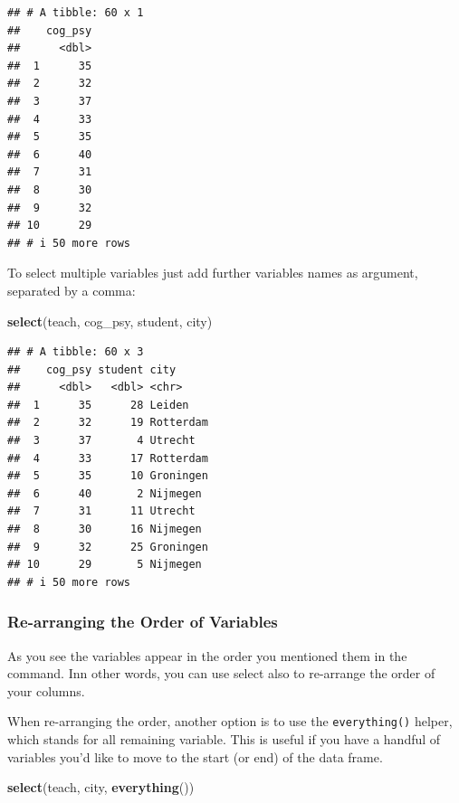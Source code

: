 \documentclass[
]{scrartcl}
\newenvironment{Shaded}{\begin{snugshade}}{\end{snugshade}}
\newcommand{\KeywordTok}[1]{\textcolor[rgb]{0.13,0.29,0.53}{\textbf{#1}}}
\newcommand{\NormalTok}[1]{#1}
\begin{document}
\begin{verbatim}
## # A tibble: 60 x 1
##    cog_psy
##      <dbl>
##  1      35
##  2      32
##  3      37
##  4      33
##  5      35
##  6      40
##  7      31
##  8      30
##  9      32
## 10      29
## # i 50 more rows
\end{verbatim}

To select multiple variables just add further variables names as argument, separated by a comma:

\begin{Shaded}
\begin{Highlighting}[]
\KeywordTok{select}\NormalTok{(teach, cog\_psy, student, city)}
\end{Highlighting}
\end{Shaded}

\begin{verbatim}
## # A tibble: 60 x 3
##    cog_psy student city     
##      <dbl>   <dbl> <chr>    
##  1      35      28 Leiden   
##  2      32      19 Rotterdam
##  3      37       4 Utrecht  
##  4      33      17 Rotterdam
##  5      35      10 Groningen
##  6      40       2 Nijmegen 
##  7      31      11 Utrecht  
##  8      30      16 Nijmegen 
##  9      32      25 Groningen
## 10      29       5 Nijmegen 
## # i 50 more rows
\end{verbatim}

\hypertarget{re-arranging-the-order-of-variables}{%
\subsubsection{Re-arranging the Order of Variables}\label{re-arranging-the-order-of-variables}}

As you see the variables appear in the order you mentioned them in the command. Inn other words, you can use select also to re-arrange the order of your columns.

When re-arranging the order, another option is to use the \texttt{everything()} helper, which stands for all remaining variable. This is useful if you have a handful of variables you'd like to move to the start (or end) of the data frame.

\begin{Shaded}
\begin{Highlighting}[]
\KeywordTok{select}\NormalTok{(teach,  city, }\KeywordTok{everything}\NormalTok{())}
\end{Highlighting}
\end{Shaded}
\end{document}
